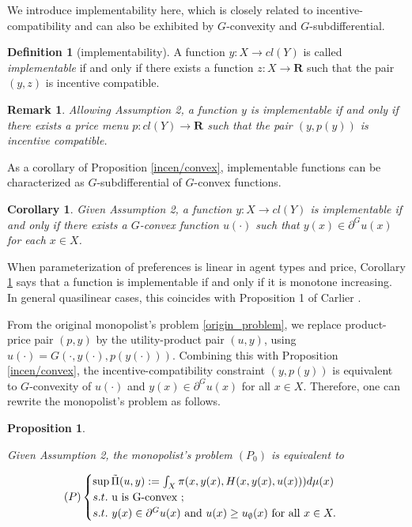 \documentclass[a4paper, 11pt]{amsart}
\numberwithin{equation}{section}
\theoremstyle{plain}
\newtheorem{corollary}[theorem]{Corollary}
\newtheorem{proposition}[theorem]{Proposition}
\newtheorem{remark}[theorem]{Remark}
\theoremstyle{definition}
\newtheorem{definition}[theorem]{Definition}
\theoremstyle{remark}
\newcommand{\R}{\mathbf{R}}
\begin{document}
{We introduce implementability here, which is closely related to incentive-compatibility and can also be exhibited by $G$-convexity and $G$-subdifferential. %
	
\begin{definition}[implementability]
		A function $y: X \rightarrow cl(Y)$ is called \textit{implementable} if and only if there exists a function $z: X \rightarrow \R$  such that the pair $(y, z)$ is incentive compatible.
\end{definition}

\begin{remark}\label{rmk:implementability}
	Allowing Assumption 2, a function $y$ is implementable if and only if there exists a price menu $p: cl(Y) \rightarrow \R$ such that the pair $(y, p(y))$ is incentive compatible.
\end{remark}


As a corollary of Proposition \ref{incen/convex},  implementable functions can be characterized as $G$-subdifferential of $G$-convex functions. 


\begin{corollary}\label{cor:implementable}
	Given Assumption 2, a function $y: X \rightarrow cl(Y)$ is implementable if and only if there exists a $G$-convex function $u(\cdot)$ such that $y(x) \in \partial^G u(x)$ for each $x\in X$.
\end{corollary}
}

When parameterization of preferences is linear in agent types and price, Corollary \ref{cor:implementable} says that a function is implementable if and only if it is monotone increasing. In general quasilinear cases, this coincides with Proposition 1 of Carlier \cite{Carlier01}. \medskip


From the original monopolist's problem \eqref{origin_problem}, we replace product-price pair $(p,y)$ by the utility-product pair $(u,y)$, using $u(\cdot) = G(\cdot, y(\cdot), p(y(\cdot)))$. %
Combining this with Proposition \ref{incen/convex}, the incentive-compatibility constraint $(y,p(y))$ is equivalent to $G$-convexity of $u(\cdot)$ and $y(x) \in \partial^G u(x)$ for all $x\in X$. Therefore, one can rewrite the monopolist's problem as follows.

\begin{proposition}\label{equiv_form}
	
	Given Assumption 2, the monopolist's problem $(P_0)$ is equivalent to
	
	\begin{equation}\label{Principal_new_problem}
	(P)
	\begin{cases}
	\sup \tilde{\Pi}(u,y):=\int_{X} \pi(x, y(x), H(x,y(x), u(x))) d\mu(x)\\
	s.t.\ $u$ \text{ is } $G$\text{-convex };\\
	s.t.\ y(x) \in \partial^G u(x) \text{ and }u(x)\ge u_{\emptyset}(x) \text{ for all } x \in X.
	\end{cases}
	\end{equation}
\end{proposition}
\end{document}
